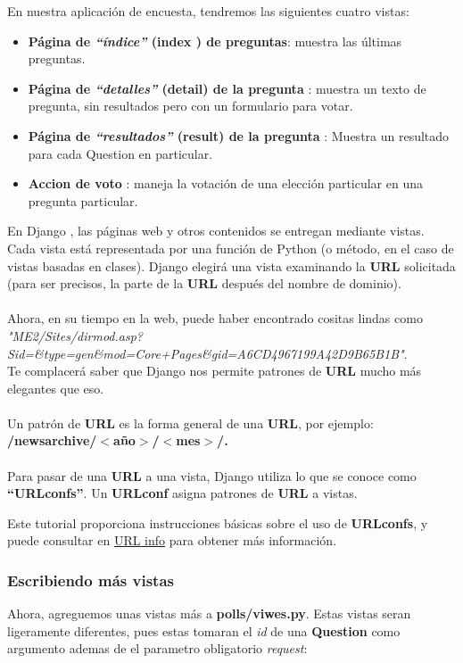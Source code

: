 \documentclass[10pt]{article}
\newcommand{\py}[1]{{\textcolor{B}{Python} #1}}
\newcommand{\django}[1]{{\textcolor{G}{Django} #1}}
\begin{document}
En nuestra aplicación de encuesta, tendremos las siguientes cuatro vistas:

\begin{itemize}
\item
\textbf{Página de \textit{``índice''} (index ) de preguntas}: muestra las últimas preguntas.

\item
\textbf{Página de \textit{``detalles''} (detail) de la pregunta} : muestra un texto de pregunta, sin resultados pero con un formulario para votar.

\item
\textbf{Página de \textit{``resultados''} (result) de la pregunta} :
Muestra un resultado para cada Question en particular.

\item
\textbf{Accion de voto} :
maneja la votación de una elección particular en una pregunta particular.
\end{itemize}

En \django{}, las páginas web y otros contenidos se entregan mediante vistas. Cada vista está representada por una función de \py{} (o método, en el caso de vistas basadas en clases). \django{} elegirá una vista examinando la \textbf{URL} solicitada (para ser precisos, la parte de la \textbf{URL} después del nombre de dominio).
\\\\
Ahora, en su tiempo en la web, puede haber encontrado cositas lindas como\\ \textit{"ME2/Sites/dirmod.asp?Sid=\&type=gen\&mod=Core+Pages\&gid=A6CD4967199A42D9B65B1B"}. \\Te complacerá saber que \django{} nos permite patrones de \textbf{URL} mucho más elegantes que eso.
\\\\
Un patrón de \textbf{URL} es la forma general de una \textbf{URL}, por ejemplo: \textbf{/newsarchive/$<$año$>$/$<$mes$>$/.}
\\\\
Para pasar de una \textbf{URL} a una vista, \django{} utiliza lo que se conoce como \textbf{``URLconfs''}. Un \textbf{URLconf} asigna patrones de \textbf{URL} a vistas.

Este tutorial proporciona instrucciones básicas sobre el uso de \textbf{URLconfs}, y puede consultar en {\href{https://docs.djangoproject.com/en/3.0/topics/http/urls/}{\textcolor{B}{URL info}}} para obtener más información.
\newpage

\subsubsection{Escribiendo más vistas}
Ahora, agreguemos unas vistas más a \textbf{polls/viwes.py}.
Estas vistas seran ligeramente diferentes, pues estas tomaran el \textit{id} de una \textbf{Question} como argumento ademas de el parametro obligatorio \textit{request}:
\end{document}
